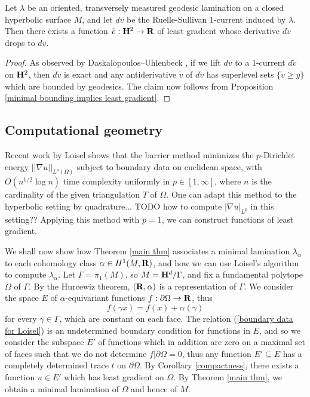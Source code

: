 \begin{corollary}\label{ruelle sullivan antiderivative}
Let $\lambda$ be an oriented, transversely measured geodesic lamination on a closed hyperbolic surface $M$, and let $dv$ be the Ruelle-Sullivan $1$-current induced by $\lambda$.
Then there exists a function $\tilde v: \mathbf H^2 \to \mathbf{R}$ of least gradient whose derivative $d\tilde v$ drops to $dv$.
\end{corollary}
\begin{proof}
As observed by Daskalopoulos--Uhlenbeck \cite[\S9]{daskalopoulos2020transverse}, if we lift $dv$ to a $1$-current $d\tilde v$ on $\mathbf H^2$, then $d\tilde v$ is exact and any antiderivative $\tilde v$ of $d\tilde v$ has superlevel sets $\{\tilde v \geq y\}$ which are bounded by geodesics.
The claim now follows from Proposition \ref{minimal bounding implies least gradient}.
\end{proof}


\subsection{Computational geometry}
Recent work by Loisel \cite{Loisel20} shows that the barrier method minimizes the $p$-Dirichlet energy $||\nabla u||_{L^p(\Omega)}$
subject to boundary data on euclidean space, with $O(n^{1/2} \log n)$ time complexity uniformly in $p \in [1, \infty]$, where $n$ is the cardinality of the given triangulation $T$ of $\Omega$.
One can adapt this method to the hyperbolic setting by quadrature... TODO how to compute $|\nabla u|_{L^p}$ in this setting??
Applying this method with $p = 1$, we can construct functions of least gradient.

We shall now show how Theorem \ref{main thm} associates a minimal lamination $\lambda_\alpha$ to each cohomology class $\alpha \in H^1(M, \mathbf{R})$, and how we can use Loisel's algorithm to compute $\lambda_\alpha$.
Let $\Gamma = \pi_1(M)$, so $M = \mathbf H^d/\Gamma$, and fix a fundamental polytope $\Omega$ of $\Gamma$.
By the Hurcewiz theorem, $(\mathbf{R}, \alpha)$ is a representation of $\Gamma$.
We consider the space $E$ of $\alpha$-equivariant functions $f: \partial \Omega \to \mathbf{R}$, thus
\begin{equation}\label{boundary data for Loisel}
f(\gamma x) = f(x) + \alpha(\gamma)
\end{equation}
for every $\gamma \in \Gamma$, which are constant on each face.
The relation (\ref{boundary data for Loisel}) is an undetermined boundary condition for functions in $E$, and so we consider the subspace $E'$ of functions which in addition are zero on a maximal set of faces such that we do not determine $f|\partial \Omega = 0$, thus any function $E' \subseteq E$ has a completely determined trace $t$ on $\partial \Omega$.
By Corollary \ref{compactness}, there exists a function $u \in E'$ which has least gradient on $\Omega$.
By Theorem \ref{main thm}, we obtain a minimal lamination of $\Omega$ and hence of $M$.

